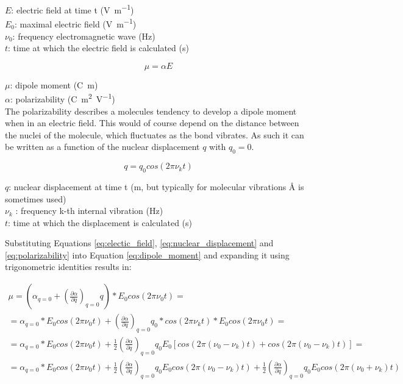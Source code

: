 \(E\): electric field at time t (\unit{\volt\per\meter})\\
\(E_0\): maximal electric field (\unit{\volt\per\meter})\\
\(\nu_0\): frequency electromagnetic wave (\unit{\hertz}) \\
\(t\): time at which the electric field is calculated (\unit{\second})

\begin{equation} \label{eq:dipole_moment}
    \mu = \alpha E
\end{equation}

\(\mu\): dipole moment (\unit{\coulomb\meter}) \\
\(\alpha \): polarizability 
(\unit{\coulomb\meter\squared\per\volt})\\


The polarizability describes a molecules tendency to develop a dipole moment when in an electric field. This would of course depend on the distance between the nuclei of the molecule, which fluctuates as the bond vibrates. As such it can be written as a function of the nuclear displacement \(q\) with \(q_0=0\).

\begin{equation} \label{eq:nuclear_displacement}
   q=q_0cos(2\pi\nu_kt)
\end{equation}

\(q\): nuclear displacement at time t (\unit{\meter}, but typically for molecular vibrations \unit{\angstrom} is sometimes used)\\
\(\nu_k \) : frequency k-th internal vibration (\unit{\hertz}) \\
\(t\): time at which the displacement is calculated (\unit{\second})

\bigskip 

Substituting Equations \ref{eq:electic_field}, \ref{eq:nuclear_displacement} and \ref{eq:polarizability} into Equation \ref{eq:dipole_moment} and expanding it using trigonometric identities results in:

\begin{multline} \label{eq:dipole_moment_expanded}
    \mu = (\alpha_{q=0} + (\frac{\partial\alpha}{\partial q})_{q=0}q)*E_0cos(2\pi\nu_0t) = \\
    = \alpha_{q=0}*E_0cos(2\pi\nu_0t) + (\frac{\partial\alpha}{\partial q})_{q=0}q_0*cos(2\pi\nu_kt)*E_0cos(2\pi\nu_0t)=\\
    =\alpha_{q=0}*E_0cos(2\pi\nu_0t) + \frac{1}{2}(\frac{\partial\alpha}{\partial q})_{q=0}q_0E_0[cos(2\pi(\nu_0-\nu_k)t)+cos(2\pi(\nu_0-\nu_k)t)]= \\
    =\alpha_{q=0}*E_0cos(2\pi\nu_0t)+\frac{1}{2}(\frac{\partial\alpha}{\partial q})_{q=0}q_0E_0cos(2\pi(\nu_0-\nu_k)t) + \frac{1}{2}(\frac{\partial\alpha}{\partial q})_{q=0}q_0E_0cos(2\pi(\nu_0+\nu_k)t)
\end{multline}

